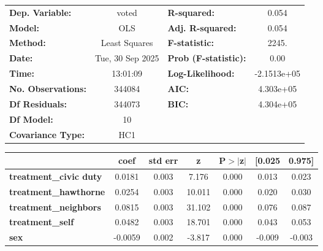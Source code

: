 \begin{center}
\begin{tabular}{lclc}
\toprule
\textbf{Dep. Variable:}        &      voted       & \textbf{  R-squared:         } &      0.054   \\
\textbf{Model:}                &       OLS        & \textbf{  Adj. R-squared:    } &      0.054   \\
\textbf{Method:}               &  Least Squares   & \textbf{  F-statistic:       } &      2245.   \\
\textbf{Date:}                 & Tue, 30 Sep 2025 & \textbf{  Prob (F-statistic):} &      0.00    \\
\textbf{Time:}                 &     13:01:09     & \textbf{  Log-Likelihood:    } & -2.1513e+05  \\
\textbf{No. Observations:}     &      344084      & \textbf{  AIC:               } &  4.303e+05   \\
\textbf{Df Residuals:}         &      344073      & \textbf{  BIC:               } &  4.304e+05   \\
\textbf{Df Model:}             &          10      & \textbf{                     } &              \\
\textbf{Covariance Type:}      &       HC1        & \textbf{                     } &              \\
\bottomrule
\end{tabular}
\begin{tabular}{lcccccc}
                               & \textbf{coef} & \textbf{std err} & \textbf{z} & \textbf{P$> |$z$|$} & \textbf{[0.025} & \textbf{0.975]}  \\
\midrule
\textbf{treatment\_civic duty} &       0.0181  &        0.003     &     7.176  &         0.000        &        0.013    &        0.023     \\
\textbf{treatment\_hawthorne}  &       0.0254  &        0.003     &    10.011  &         0.000        &        0.020    &        0.030     \\
\textbf{treatment\_neighbors}  &       0.0815  &        0.003     &    31.102  &         0.000        &        0.076    &        0.087     \\
\textbf{treatment\_self}       &       0.0482  &        0.003     &    18.701  &         0.000        &        0.043    &        0.053     \\
\textbf{sex}                   &      -0.0059  &        0.002     &    -3.817  &         0.000        &       -0.009    &       -0.003     \\

\end{tabular}
\end{center}
